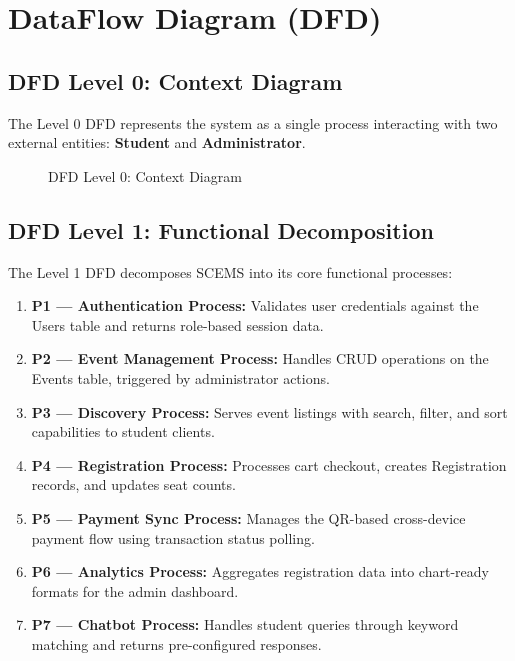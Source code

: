 \section{DataFlow Diagram (DFD)}

\subsection{DFD Level 0: Context Diagram}
The Level 0 DFD represents the system as a single process interacting with two external entities: \textbf{Student} and \textbf{Administrator}.

\begin{figure}[H]
\centering
{}
\caption{DFD Level 0: Context Diagram}
\label{fig:dfd0}
\end{figure}

\subsection{DFD Level 1: Functional Decomposition}
The Level 1 DFD decomposes SCEMS into its core functional processes:

\begin{enumerate}
    \item \textbf{P1 --- Authentication Process:} Validates user credentials against the Users table and returns role-based session data.
    \item \textbf{P2 --- Event Management Process:} Handles CRUD operations on the Events table, triggered by administrator actions.
    \item \textbf{P3 --- Discovery Process:} Serves event listings with search, filter, and sort capabilities to student clients.
    \item \textbf{P4 --- Registration Process:} Processes cart checkout, creates Registration records, and updates seat counts.
    \item \textbf{P5 --- Payment Sync Process:} Manages the QR-based cross-device payment flow using transaction status polling.
    \item \textbf{P6 --- Analytics Process:} Aggregates registration data into chart-ready formats for the admin dashboard.
    \item \textbf{P7 --- Chatbot Process:} Handles student queries through keyword matching and returns pre-configured responses.
\end{enumerate}

